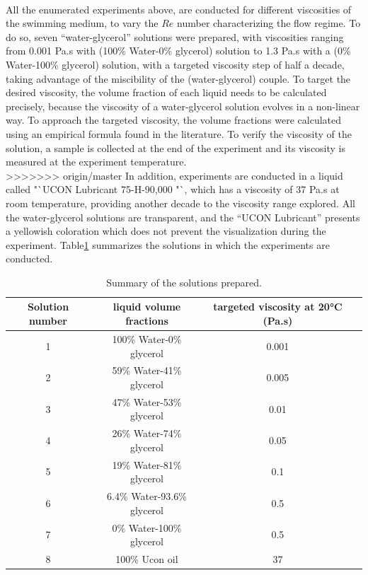 \paragraph{}
All the enumerated experiments above, are conducted for different viscosities of the swimming medium, to vary the $Re$ number characterizing the flow regime. To do so, seven "`water-glycerol"' solutions were prepared, with viscosities ranging from 0.001 Pa.s with (100\% Water-0\% glycerol) solution  to 1.3 Pa.s with a (0\% Water-100\% glycerol) solution, with a targeted viscosity step of half a decade, taking advantage of the miscibility of the (water-glycerol) couple. To target the desired viscosity, the volume fraction of each liquid needs to be calculated precisely, because the viscosity of a water-glycerol solution evolves in a non-linear way\cite{viscositynonlinearCheng}. To approach the targeted viscosity, the volume fractions were calculated using an empirical formula found in the literature\cite{viscositynonlinearCheng}. To verify the viscosity of the solution, a sample is collected at the end of the experiment and its viscosity is measured at the experiment temperature.\\
>>>>>>> origin/master
In addition, experiments are conducted in a liquid called "`UCON Lubricant 75-H-90,000 "`, which has a viscosity of 37 Pa.s at room temperature, providing another decade to the viscosity range explored. All the water-glycerol solutions are transparent, and the "`UCON Lubricant"' presents a yellowish coloration which does not prevent the visualization during the experiment. 
Table\ref{tab:viscosities} summarizes the solutions in which the experiments are conducted.
\begin{table}[H]
	\centering
		\begin{adjustbox}{width=\textwidth}
			\begin{tabular}{|c|c|c|c|}
				\hline
				Solution number & liquid volume fractions & targeted viscosity at 20°C (Pa.s)\\
				\hline
				1&100\% Water-0\% glycerol&0.001\\
				2&59\% Water-41\% glycerol&0.005\\
				3&47\% Water-53\% glycerol&0.01\\
				4&26\% Water-74\% glycerol&0.05\\
				5&19\% Water-81\% glycerol&0.1\\
				6&6.4\% Water-93.6\% glycerol&0.5\\
				7&0\% Water-100\% glycerol&0.5\\
				8&100\% Ucon oil&37\\
				\hline
			\end{tabular}
		\end{adjustbox}
	\caption{Summary of the solutions prepared.}
	\label{tab:viscosities}
\end{table}
  
